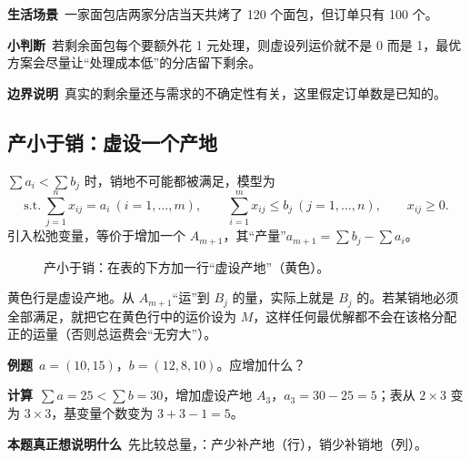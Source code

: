 \begin{lifebox}[面包店的当日剩余]
\textbf{生活场景}\ 一家面包店两家分店当天共烤了 120 个面包，但订单只有 100 个。\par
{}
\textbf{小判断}\ 若剩余面包每个要额外花 1 元处理，则虚设列运价就不是 0 而是 1，最优方案会尽量让“处理成本低”的分店留下剩余。\par
\textbf{边界说明}\ 真实的剩余量还与需求的不确定性有关，这里假定订单数是已知的。
\end{lifebox}

\subsection{产小于销：虚设一个产地}
\begin{definitionbox}[产小于销的运输问题]
$\sum a_i<\sum b_j$ 时，销地不可能都被满足，模型为
\[
\text{s.t.}\ \sum_{j=1}^n x_{ij}=a_i\ (i=1,\dots,m),\qquad \sum_{i=1}^m x_{ij}\le b_j\ (j=1,\dots,n),\qquad x_{ij}\ge0 .
\]
引入松弛变量，等价于增加一个 $A_{m+1}$，其“产量”$a_{m+1}=\sum b_j-\sum a_i$。
\end{definitionbox}
\begin{figure}[H]
\centering
{}
\caption{产小于销：在表的下方加一行“虚设产地”（黄色）。}\label{fig:addrow}
\end{figure}
黄色行是虚设产地。从 $A_{m+1}$“运”到 $B_j$ 的量，实际上就是 $B_j$ 的。若某销地必须全部满足，就把它在黄色行中的运价设为 $M$，这样任何最优解都不会在该格分配正的运量（否则总运费会“无穷大”）。

\begin{examplebox}
\textbf{例题}\ $a=(10,15)$，$b=(12,8,10)$。应增加什么？\par
\textbf{计算}\ $\sum a=25<\sum b=30$，增加虚设产地 $A_3$，$a_3=30-25=5$；表从 $2\times3$ 变为 $3\times3$，基变量个数变为 $3+3-1=5$。\par
\textbf{本题真正想说明什么}\ 先比较总量，：产少补产地（行），销少补销地（列）。
\end{examplebox}

